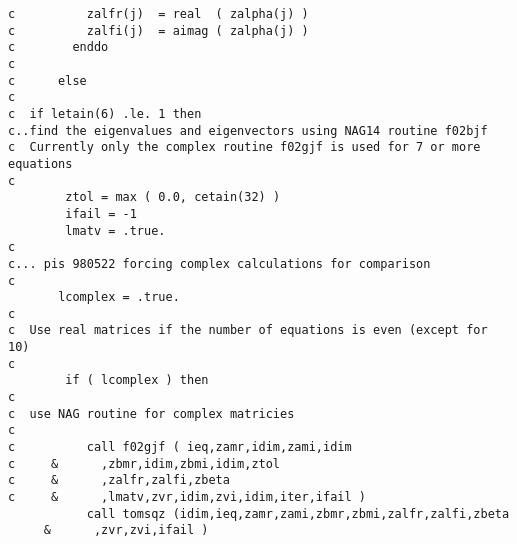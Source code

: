 \begin{verbatim}
c          zalfr(j)  = real  ( zalpha(j) )
c          zalfi(j)  = aimag ( zalpha(j) )
c        enddo
c
c      else
c
c  if letain(6) .le. 1 then
c..find the eigenvalues and eigenvectors using NAG14 routine f02bjf
c  Currently only the complex routine f02gjf is used for 7 or more equations
c
        ztol = max ( 0.0, cetain(32) )
        ifail = -1
        lmatv = .true.
c
c... pis 980522 forcing complex calculations for comparison
c
       lcomplex = .true.
c
c  Use real matrices if the number of equations is even (except for 10)
c
        if ( lcomplex ) then
c
c  use NAG routine for complex matricies
c
c          call f02gjf ( ieq,zamr,idim,zami,idim
c     &      ,zbmr,idim,zbmi,idim,ztol
c     &      ,zalfr,zalfi,zbeta
c     &      ,lmatv,zvr,idim,zvi,idim,iter,ifail )
           call tomsqz (idim,ieq,zamr,zami,zbmr,zbmi,zalfr,zalfi,zbeta
     &      ,zvr,zvi,ifail )


\end{verbatim}
